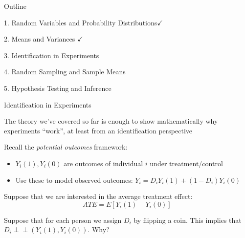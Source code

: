 \documentclass[11pt,english,handout]{beamer}
\newenvironment{wideitemize}{\itemize\addtolength{\itemsep}{10pt}}{\enditemize}
\newcommand{\indep}{\perp\!\!\!\!\perp}
\begin{document}
\begin{frame}{Outline}
	
	\textcolor{red!75!green!50!blue!25!gray}{1. Random Variables and Probability Distributions}$\checkmark$
	\vspace{0.8cm}
	
	\textcolor{red!75!green!50!blue!25!gray}{2. Means and Variances} $\checkmark$
	\vspace{0.8cm}
	
	3. Identification in Experiments 
	\vspace{0.8cm}
	
	\textcolor{red!75!green!50!blue!25!gray}{4. Random Sampling and Sample Means}
	
	\vspace{0.8cm}
	\textcolor{red!75!green!50!blue!25!gray}{5. Hypothesis Testing and Inference}
	
\end{frame}

\begin{frame}{Identification in Experiments}
\begin{wideitemize}
\item
The theory we've covered so far is enough to show mathematically why experiments ``work'', at least from an identification perspective
\pause
\item Recall the \textit{potential outcomes} framework: 

\begin{itemize}
	\item
	$Y_i(1), Y_i(0)$ are outcomes of individual $i$ under treatment/control\smallskip
	
	\item
	Use these to model observed outcomes: $Y_i = D_i Y_i(1) + (1-D_i) Y_i(0)$ 
	
\end{itemize}

\pause
\item 
Suppose that we are interested in the average treatment effect:
$$ATE = E[Y_i(1) - Y_i(0) ]$$

\pause
\item
Suppose that for each person we assign $D_i$ by flipping a coin. This implies that $D_i \indep (Y_i(1),Y_i(0))$. Why?	
\end{wideitemize}		
\end{frame}
\end{document}
